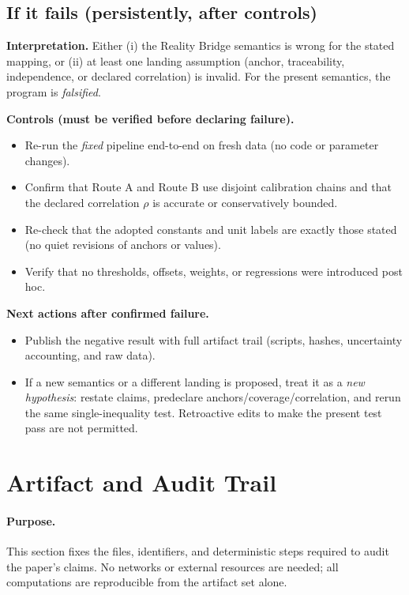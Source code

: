 \documentclass[11pt]{article}
\theoremstyle{plain}
\theoremstyle{definition}
\theoremstyle{remark}
\begin{document}
\subsection*{If it fails (persistently, after controls)}
\textbf{Interpretation.} Either (i) the Reality Bridge semantics is wrong for the stated mapping, or (ii) at least one landing assumption (anchor, traceability, independence, or declared correlation) is invalid. For the present semantics, the program is \emph{falsified}.

\textbf{Controls (must be verified before declaring failure).}
\begin{itemize}
  \item Re-run the \emph{fixed} pipeline end-to-end on fresh data (no code or parameter changes).
  \item Confirm that Route A and Route B use disjoint calibration chains and that the declared correlation \(\rho\) is accurate or conservatively bounded.
  \item Re-check that the adopted constants and unit labels are exactly those stated (no quiet revisions of anchors or values).
  \item Verify that no thresholds, offsets, weights, or regressions were introduced post hoc.
\end{itemize}

\textbf{Next actions after confirmed failure.}
\begin{itemize}
  \item Publish the negative result with full artifact trail (scripts, hashes, uncertainty accounting, and raw data).
  \item If a new semantics or a different landing is proposed, treat it as a \emph{new hypothesis}: restate claims, predeclare anchors/coverage/correlation, and rerun the same single-inequality test. Retroactive edits to make the present test pass are not permitted.
\end{itemize}

\section{Artifact and Audit Trail}

\paragraph{Purpose.}
This section fixes the files, identifiers, and deterministic steps required to audit the paper’s claims. No networks or external resources are needed; all computations are reproducible from the artifact set alone.
\end{document}
